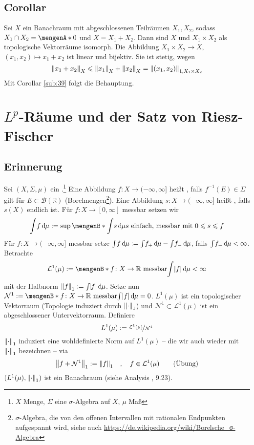\subsection[Corollar: Wenn $X= X_1 \oplus X_2$, so ist $X$ isomorph zu $X_1 \times X_2$]{Corollar} %
\label{sub:311}
Sei $X$ ein Banachraum mit abgeschlossenen Teilräumen $X_1,X_2$, sodass $X_1 \cap X_2 = \set{0}$ und $X= X_1 + X_2$. Dann sind $X$ und $X_1 \times X_2$ als topologische
Vektorräume isomorph.
Die Abbildung $X_1 \times X_2 \to X$, $(x_1,x_2) \mapsto x_1 + x_2$ ist linear und bijektiv. Sie ist stetig, wegen 
\[
	\norm[X]{x_1 + x_2} \le \norm[X]{x_1} + \norm[X]{x_2} = \norm[1,X_1 \times X_2]{(x_1,x_2)} 
\]
Mit Corollar \ref{sub:39} folgt die Behauptung. \bewende
\newpage

\section{$L^p$-Räume und der Satz von Riesz-Fischer} %
\label{sec:4}

\subsection[Erinnerung: $L^1(\mu)$ ist ein Banachraum]{Erinnerung} %
\label{sub:41}
Sei $(X,\Sigma, \mu)$ ein .\footnote{$X$ Menge, $\Sigma$ eine $\sigma$-Algebra auf $X$, $\mu$ Maß} Eine Abbildung $f\colon X \to (-\infty,\infty]$ heißt 
, falls $f ^{-1}(E) \in \Sigma$ gilt für $E \subset \mathcal{B}(\mathds{R})$ (Borelmengen\footnote{$\sigma$-Algebra, die von den offenen Intervallen mit 
rationalen Endpunkten aufgespannt wird, siehe auch \url{https://de.wikipedia.org/wiki/Borelsche_σ-Algebra}}). Eine Abbildung $s\colon X \to (-\infty,\infty]$ heißt 
, falls $s(X)$ endlich ist. Für $f \colon X \to [0,\infty]$ messbar setzen wir
\[
	\int \! f  \, \mathd \mu := \sup \set[\int \! s \, \mathd \mu]{s \text{ einfach, messbar mit } 0 \le s \le f} 
\] 
Für $f\colon X \to (-\infty,\infty]$ messbar setze $\int\! f \, \mathrm{d}\mkern-1.0mu \mu := \int \! f_+ \, \mathrm{d}\mkern-1.0mu \mu - \int \! f_- \, \mathrm{d}\mkern-1.0mu \mu$, falls 
$\int \! f_- \, \mathrm{d}\mkern-1.0mu \mu < \infty$. Betrachte
\begin{align*}
	\mathcal{L}^1(\mu) := \set[f \colon X \to \mathds{R} \text{ messbar}]{\int \abs*{f}\,\mathd \mu < \infty } 
\end{align*}
mit der Halbnorm $\norm[1]{f} := \int \! \abs*{f} \, \mathd \mu $. Setze nun $\mathcal{N}^1 := \set[f\colon X\to\mathds{R} \text{ messbar}]{\int \abs*{f} \, \mathd \mu =0 }$.
$L^1(\mu)$ ist ein topologischer Vektorraum (Topologie induziert durch $\norm[1]{\cdot}$) und $\mathcal{N}^1 \subset \mathcal{L}^1(\mu)$ ist ein abgeschlossener 
Untervektorraum. Definiere 
\[
	L^1(\mu) := \nicefrac{\mathcal{L}^1(\mu)}{\mathcal{N}^1}
\]
$\norm[1]{\cdot }$ induziert eine wohldefinierte Norm auf $L^1(\mu)$ -- die wir auch wieder mit $\norm[1]{\cdot }$ bezeichnen -- via  
\[
	\norm[1]{f+ \mathcal{N}^1} := \norm[1]{f} \quad , \quad f \in \mathcal{L}^1(\mu) \tag*{(Übung)}
\]
$(L^1(\mu),\norm[1]{\cdot})$ ist ein Banachraum (siehe Analysis , 9.23).

